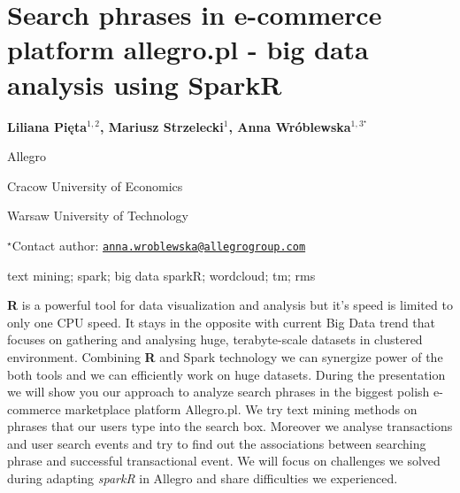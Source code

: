 \documentclass[\main/boa.tex]{subfiles}
\begin{document}
\section{Search phrases in e-commerce platform allegro.pl - big data analysis
using SparkR}

\begin{center}
  {\bf Liliana Pięta$^{1, 2}$, Mariusz Strzelecki$^{1}$, Anna Wróblewska$^{1, 3^\star}$}
\end{center}

\vskip 0.3cm

\begin{affiliations}
\begin{enumerate}
\begin{minipage}{0.915\textwidth}
\centering
\item Allegro \\[-2pt]
\item Cracow University of Economics \\[-2pt]
\item Warsaw University of Technology \\[-2pt]
\end{minipage}
\end{enumerate}
$^\star$Contact author: \href{mailto:anna.wroblewska@allegrogroup.com}{\nolinkurl{anna.wroblewska@allegrogroup.com}}\\
\end{affiliations}

\vskip 0.5cm

\begin{minipage}{0.915\textwidth}
\keywords text mining; spark; big data
\packages sparkR; wordcloud; tm; rms
\end{minipage}

\vskip 0.8cm

\textbf{R} is a powerful tool for data visualization and analysis but
it's speed is limited to only one CPU speed. It stays in the opposite
with current Big Data trend that focuses on gathering and analysing
huge, terabyte-scale datasets in clustered environment. Combining
\textbf{R} and Spark technology we can synergize power of the both tools
and we can efficiently work on huge datasets. During the presentation we
will show you our approach to analyze search phrases in the biggest
polish e-commerce marketplace platform Allegro.pl. We try text mining
methods on phrases that our users type into the search box. Moreover we
analyse transactions and user search events and try to find out the
associations between searching phrase and successful transactional
event. We will focus on challenges we solved during adapting
\emph{sparkR} in Allegro and share difficulties we experienced.
\end{document}

